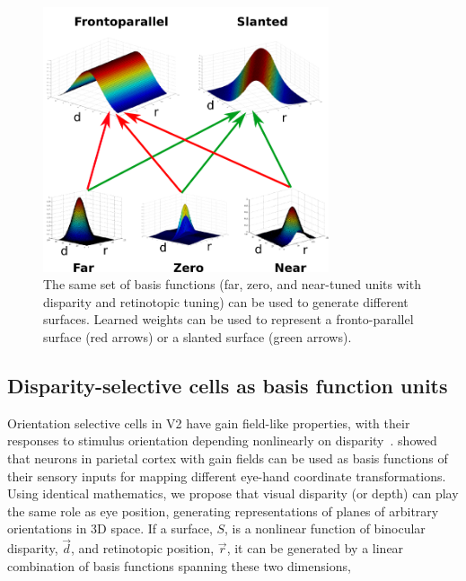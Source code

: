 \begin{figure}[t]
\centering
\includegraphics[width=0.75\textwidth]{3D-Surface/figs/basisfunc_new.png}
\makeatletter
\let\@currsize\normalsize
\caption[Basis functions can flexibly represent different surfaces using learned weights]{The same set of basis functions (\eg far, zero, and near-tuned units with disparity and retinotopic tuning) can be used to generate different surfaces. Learned weights can be used to represent a fronto-parallel surface (red arrows) or a slanted surface (green arrows).}
\label{Basis functions}
\end{figure}

\subsection{Disparity-selective cells as basis function units}
\label{sec:basis_func}

Orientation selective cells in V2 have gain field-like properties, with their responses to stimulus orientation depending nonlinearly on disparity~\citep{vonderHeydt_etal00a}.
\citet{Pouget_Sejnowski97b} showed that neurons in parietal cortex with gain fields can be used as basis functions of their sensory inputs for mapping different eye-hand coordinate transformations. Using identical mathematics, we propose that visual disparity (or depth) can play the same role as eye position, generating representations of planes of arbitrary orientations in 3D space. If a surface, $S$, is a nonlinear function of binocular disparity, $\vec{d}$, and retinotopic position, $\vec{r}$, it can be generated by a linear combination of basis functions spanning these two dimensions,

